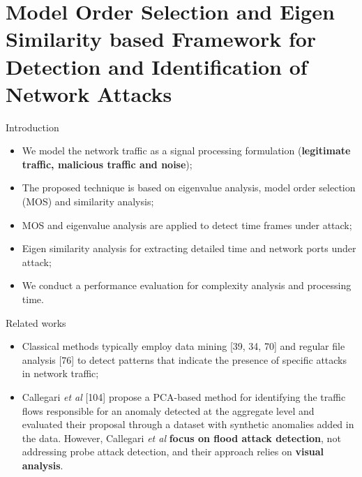 \documentclass[newPxFont, numfooter, sectionpages]{beamer}
\begin{document}
\section{Model Order Selection and Eigen Similarity based Framework for Detection and Identification of Network Attacks}
\begin{frame}[c]{Introduction}
	\begin{itemize}
		\item We model the network traffic as a signal processing formulation (\textbf{legitimate traffic, malicious traffic and noise});
		\item The proposed technique is based on eigenvalue analysis, model order selection (MOS) and similarity analysis;
		\item MOS and eigenvalue analysis are applied to detect time frames under attack;
		\item Eigen similarity analysis for extracting detailed time and network ports under attack;
		\item We conduct a performance evaluation for complexity analysis and processing time.
	\end{itemize}
\end{frame}
\begin{frame}[c]{Related works}
	
	\begin{itemize}
		\item Classical methods typically employ data mining [39, 34, 70] and regular file analysis [76] to detect patterns that indicate the presence of specific attacks in network traffic;
		\item Callegari \emph{et al} [104] propose a PCA-based method for identifying the traffic flows responsible for an anomaly detected at the aggregate level and evaluated their proposal through a dataset with synthetic anomalies added in the data. However, Callegari \emph{et al} \textbf{focus on flood attack detection}, not addressing probe attack detection, and their approach relies on \textbf{visual analysis}.
	\end{itemize}
	
\end{frame}
\end{document}
